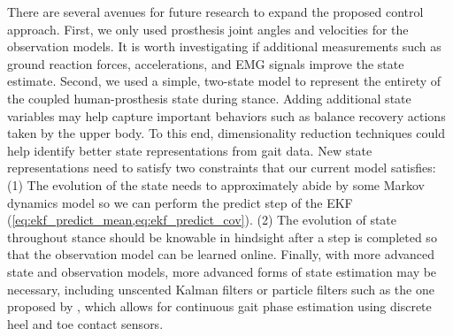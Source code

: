 There are several avenues for future research to expand the proposed control
approach. First, we only used prosthesis joint angles and velocities for the
observation models. It is worth investigating if additional measurements such as
ground reaction forces, accelerations, and EMG signals improve the state
estimate.  Second, we used a simple, two-state model to represent the entirety
of the coupled human-prosthesis state during stance. Adding additional state
variables may help capture important behaviors such as balance recovery actions
taken by the upper body. To this end, dimensionality reduction techniques could
help identify better state representations from gait data. New state
representations need to satisfy two constraints that our current model
satisfies: (1) The evolution of the state needs to approximately abide by some
Markov dynamics model so we can perform the predict step of the EKF
(\cref{eq:ekf_predict_mean,eq:ekf_predict_cov}). (2) The evolution of state
throughout stance should be knowable in hindsight after a step is completed so
that the observation model can be learned online. Finally, with more advanced
state and observation models, more advanced forms of state estimation may be
necessary, including unscented Kalman filters or particle filters such as the
one proposed by \citet{dhir2018locomotion}, which allows for continuous gait
phase estimation using discrete heel and toe contact sensors. 
